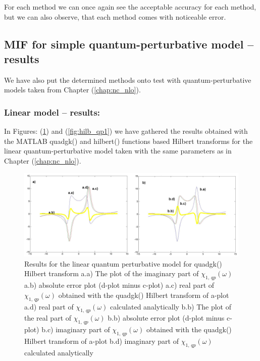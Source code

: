 \documentclass[12pt,twoside,a4paper]{article}
\numberwithin{equation}{subsection}
\numberwithin{figure}{subsection}
\begin{document}
For each method we can once again see the acceptable accuracy for each method, but we can also observe, that each method comes with noticeable error.

\subsection{MIF for simple quantum-perturbative model -- results} \label{chap:matlab_quantum}

We have also put the determined methods onto test with quantum-perturbative models taken from Chapter (\ref{chap:nc_nlo}).

\subsubsection*{Linear model -- results:}

In Figures: (\ref{fig:quadgk_qp1}) and (\ref{fig:hilb_qp1}) we have gathered the results ob\-tained with the MATLAB quadgk() and hilbert() functions based Hil\-bert tran\-sforms for the linear qua\-ntum\--per\-tur\-ba\-tive model taken with the same para\-meters as in Chapter (\ref{chap:nc_nlo}).

\begin{figure}
  \includegraphics[width=150mm]{img/quadgk_qp1.png}
  \caption{Results for the linear quantum perturbative model for quadgk() Hilbert transform
    a.a) The plot of the imaginary part of ${\chi_{1, \, qp}}(\omega )$
    a.b) absolute error plot (d-plot minus c-plot) 
    a.c) real part of ${\chi_{1, \, qp}}(\omega )$ obtained with the quadgk() Hilbert transform of a-plot 
    a.d) real part of ${\chi_{1, \, qp}}(\omega )$ calculated analytically 
    b.b) The plot of the real part of ${\chi_{1, \, qp}}(\omega )$ 
    b.b) absolute error plot (d-plot minus c-plot) 
    b.c) imaginary part of ${\chi_{1, \, qp}}(\omega )$ obtained with the quadgk()  Hilbert transform of a-plot 
    b.d) imaginary part of ${\chi_{1, \, qp}}(\omega )$ calculated analytically  
    \label{fig:quadgk_qp1}
  }
\end{figure}
\end{document}

